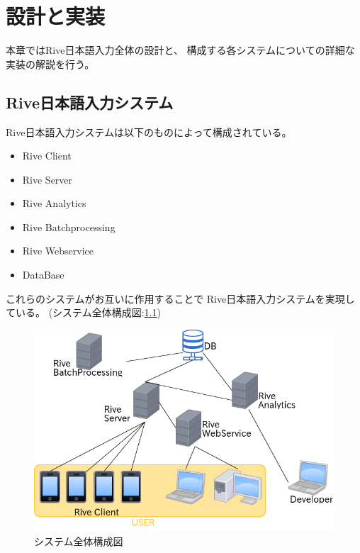 \chapter{設計と実装}
\label{chap:implementation}
本章ではRive日本語入力全体の設計と、
構成する各システムについての詳細な実装の解説を行う。

\newpage
\section{Rive日本語入力システム}
Rive日本語入力システムは以下のものによって構成されている。
\begin{itemize}
  \item Rive Client
  \item Rive Server
  \item Rive Analytics
  \item Rive Batchprocessing
  \item Rive Webservice
  \item DataBase
\end{itemize}
これらのシステムがお互いに作用することで
Rive日本語入力システムを実現している。
(システム全体構成図:\ref{fig:systemstructure})
\begin{figure}[htbp]
  \begin{center}
    \includegraphics[width=120mm,bb=0 0 540 448]{images/systemstructure.png}
  \end{center}
  \caption{システム全体構成図}
  \label{fig:systemstructure}
\end{figure}

